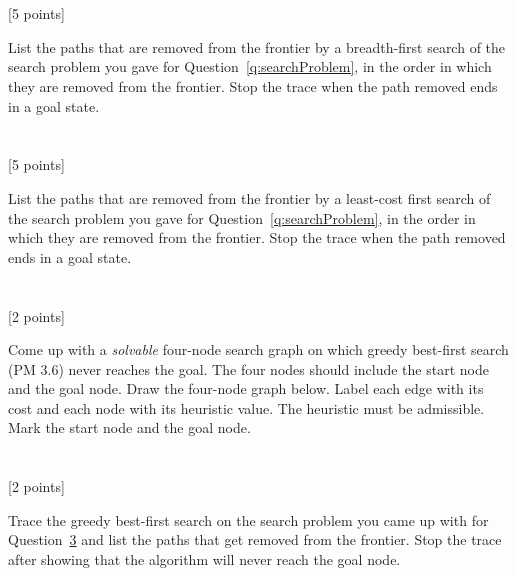 \documentclass[10pt]{article}
\newcommand{\tcb}[1]{\textcolor{m1}{#1}}
\newcommand{\tcv}[1]{\textcolor{m4}{#1}}
\newcounter{totalpoints}
\newcommand{\points}[1]{{\addtocounter{totalpoints}{#1}\tcv{[#1 points]}}}
\begin{document}
\clearpage\section{} 
\points{5} 
List the paths that are removed from the frontier by a breadth-first search of the search problem you gave for Question~\ref{q:searchProblem}, in the order in which they are removed from the frontier. Stop the trace when the path removed ends in a goal state.

\begin{answer}{1.2in}
\end{answer}

\section{} 
\points{5} 
List the paths that are removed from the frontier by a least-cost first search of the search problem you gave for Question~\ref{q:searchProblem}, in the order in which they are removed from the frontier. Stop the trace when the path removed ends in a goal state.

\begin{answer}{1.2in}
\end{answer}

\section{} \label{q:gbfs}
\points{2} 
Come up with a {\em solvable} four-node search graph on which greedy best-first search (\tcb{PM 3.6}) never reaches the goal. The four nodes should include the start node and the goal node. Draw the four-node graph below. Label each edge with its cost and each node with its heuristic value. The heuristic must be admissible. Mark the start node and the goal node.

\begin{answer}{0.75in}
\end{answer}

\section{} 
\points{2} 
Trace the greedy best-first search on the search problem you came up with for Question~\ref{q:gbfs} and list the paths that get removed from the frontier. Stop the trace after showing that the algorithm will never reach the goal node.

\begin{answer}{1.5in}
\end{answer}
\end{document}

